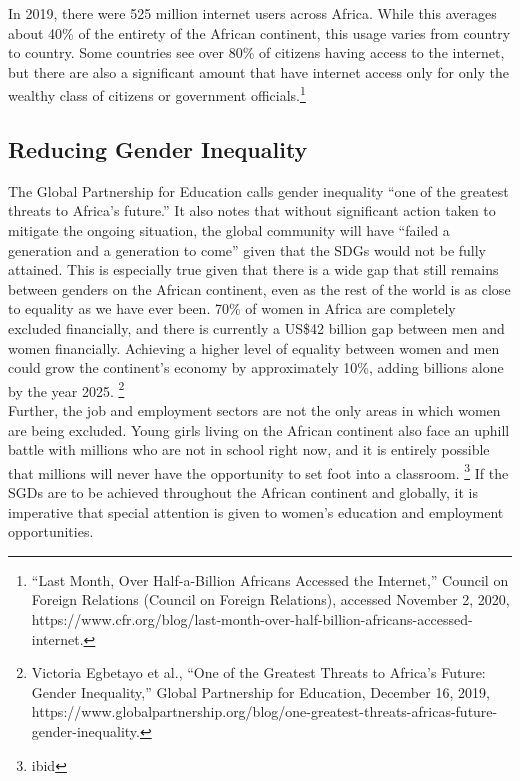 \documentclass[10pt, letterpaper]{article}
\begin{document}
In 2019, there were 525 million internet users across Africa. While this
averages about 40\% of the entirety of the African continent, this usage
varies from country to country. Some countries see over 80\% of citizens
having access to the internet, but there are also a significant amount
that have internet access only for only the wealthy class of citizens or
government officials.\footnote{``Last Month, Over Half-a-Billion
  Africans Accessed the Internet,'' Council on Foreign Relations
  (Council on Foreign Relations), accessed November 2, 2020,
  https://www.cfr.org/blog/last-month-over-half-billion-africans-accessed-internet.} \\

\subsection{Reducing Gender Inequality}

The Global Partnership for Education calls gender inequality ``one of
the greatest threats to Africa's future.'' It also notes that without
significant action taken to mitigate the ongoing situation, the global
community will have ``failed a generation and a generation to come''
given that the SDGs would not be fully attained. This is especially true
given that there is a wide gap that still remains between genders on the
African continent, even as the rest of the world is as close to equality
as we have ever been. 70\% of women in Africa are completely excluded
financially, and there is currently a US\$42 billion gap between men and
women financially. Achieving a higher level of equality between women
and men could grow the continent's economy by approximately 10\%, adding
billions alone by the year 2025. \footnote{Victoria Egbetayo et al.,
  ``One of the Greatest Threats to Africa's Future: Gender Inequality,''
  Global Partnership for Education, December 16, 2019,
  https://www.globalpartnership.org/blog/one-greatest-threats-africas-future-gender-inequality.} \\

Further, the job and employment sectors are not the only areas in which
women are being excluded. Young girls living on the African continent
also face an uphill battle with millions who are not in school right
now, and it is entirely possible that millions will never have the
opportunity to set foot into a classroom. \footnote{ibid} If the SGDs
are to be achieved throughout the African continent and globally, it is
imperative that special attention is given to women's education and
employment opportunities. \\
\end{document}
